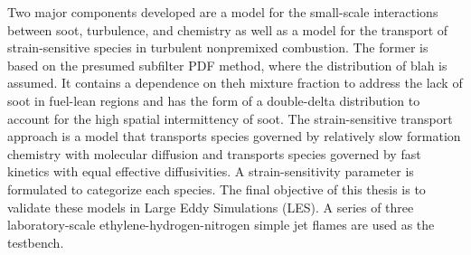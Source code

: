 

Two major components developed are a model for the small-scale interactions between soot, turbulence, and chemistry as well as a model for the transport of strain-sensitive species in turbulent nonpremixed combustion. The former is based on the presumed subfilter PDF method, where the distribution of blah is assumed. It contains a dependence on theh mixture fraction to address the lack of soot in fuel-lean regions and has the form of a double-delta distribution to account for the high spatial intermittency of soot. The strain-sensitive transport approach is a model that transports species governed by relatively slow formation chemistry with molecular diffusion and transports species governed by fast kinetics with equal effective diffusivities. A strain-sensitivity parameter is formulated to categorize each species. The final objective of this thesis is to validate these models in Large Eddy Simulations (LES). A series of three laboratory-scale ethylene-hydrogen-nitrogen simple jet flames are used as the testbench.








